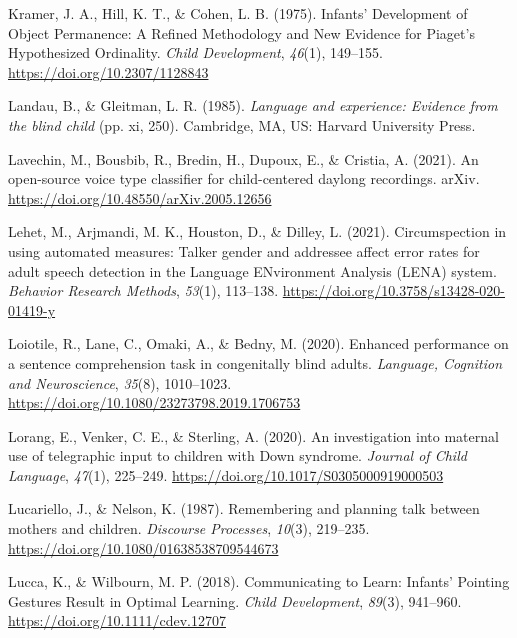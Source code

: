 \documentclass[
  man,floatsintext]{apa6}
\newlength{\cslhangindent}
\newlength{\cslentryspacingunit} %
\newenvironment{CSLReferences}[2] %
 {%
  \setlength{\parindent}{0pt}
  \ifodd #1
  \let\oldpar\par
  \def\par{\hangindent=\cslhangindent\oldpar}
  \fi
  \setlength{\parskip}{#2\cslentryspacingunit}
 }%
 {}
\begin{document}
\begin{CSLReferences}{1}{0}
\leavevmode{}%
Kramer, J. A., Hill, K. T., \& Cohen, L. B. (1975). Infants' {Development} of {Object Permanence}: {A Refined Methodology} and {New Evidence} for {Piaget}'s {Hypothesized Ordinality}. \emph{Child Development}, \emph{46}(1), 149--155. \url{https://doi.org/10.2307/1128843}

\leavevmode{}%
Landau, B., \& Gleitman, L. R. (1985). \emph{Language and experience: {Evidence} from the blind child} (pp. xi, 250). {Cambridge, MA, US}: {Harvard University Press}.

\leavevmode{}%
Lavechin, M., Bousbib, R., Bredin, H., Dupoux, E., \& Cristia, A. (2021). An open-source voice type classifier for child-centered daylong recordings. {arXiv}. \url{https://doi.org/10.48550/arXiv.2005.12656}

\leavevmode{}%
Lehet, M., Arjmandi, M. K., Houston, D., \& Dilley, L. (2021). Circumspection in using automated measures: {Talker} gender and addressee affect error rates for adult speech detection in the {Language ENvironment Analysis} ({LENA}) system. \emph{Behavior Research Methods}, \emph{53}(1), 113--138. \url{https://doi.org/10.3758/s13428-020-01419-y}

\leavevmode{}%
Loiotile, R., Lane, C., Omaki, A., \& Bedny, M. (2020). Enhanced performance on a sentence comprehension task in congenitally blind adults. \emph{Language, Cognition and Neuroscience}, \emph{35}(8), 1010--1023. \url{https://doi.org/10.1080/23273798.2019.1706753}

\leavevmode{}%
Lorang, E., Venker, C. E., \& Sterling, A. (2020). An investigation into maternal use of telegraphic input to children with {Down} syndrome. \emph{Journal of Child Language}, \emph{47}(1), 225--249. \url{https://doi.org/10.1017/S0305000919000503}

\leavevmode{}%
Lucariello, J., \& Nelson, K. (1987). Remembering and planning talk between mothers and children. \emph{Discourse Processes}, \emph{10}(3), 219--235. \url{https://doi.org/10.1080/01638538709544673}

\leavevmode{}%
Lucca, K., \& Wilbourn, M. P. (2018). Communicating to {Learn}: {Infants}' {Pointing Gestures Result} in {Optimal Learning}. \emph{Child Development}, \emph{89}(3), 941--960. \url{https://doi.org/10.1111/cdev.12707}


\end{CSLReferences}
\end{document}
